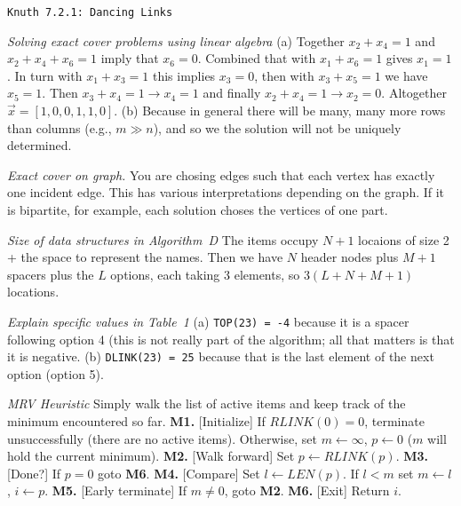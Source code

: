 \topglue 0.5in
\centerline{\tt Knuth 7.2.1: Dancing Links}
\vskip 0.3in

 {\it Solving exact cover problems using
linear algebra}\hfil\break
(a) Together $x_2 + x_4 = 1$ and $x_2 + x_4 + x_6 = 1$
imply that $x_6 = 0$.  Combined that with $x_1 + x_6 = 1$
gives $x_1 = 1$.  In turn with $x_1 + x_3 = 1$ this implies
$x_3 = 0$, then with $x_3 + x_5 = 1$ we have $x_5 = 1$.
Then $x_3 + x_4 = 1 \rightarrow x_4 = 1$ and finally
$x_2 + x_4 = 1 \rightarrow x_2 = 0$.  Altogether
$\vec{x} = [1, 0, 0, 1, 1, 0]$.\hfil\break
(b) Because in general there will be many, many more
rows than columns (e.g., $m \gg n$), and so we the solution
will not be uniquely determined.

 {\it Exact cover on graph.}\hfil\break
You are chosing edges such that each vertex has exactly one incident edge.
This has various interpretations depending on the graph.  If it is bipartite, for
example, each solution choses the vertices of one part.

 {\it Size of data structures in Algorithm~D}\hfil\break
The items occupy $N+1$ locaions of size 2 + the space to represent the names.
Then we have $N$ header nodes plus $M+1$ spacers plus the $L$ options,
each taking 3 elements, so $3\left(L + N + M + 1\right)$ locations.

 {\it Explain specific values in Table~1}\hfil\break
(a) {\tt TOP(23) = -4} because it is a spacer following option 4 (this is not
really part of the algorithm; all that matters is that it is negative.\hfil\break
(b) {\tt DLINK(23) = 25} because that is the last element of the next option
(option 5).

 {\it MRV Heuristic}\hfil\break
Simply walk the list of active items and keep track of the minimum encountered
so far.\hfil\break
{\bf M1.} [Initialize] If $RLINK\left(0\right) = 0$, terminate unsuccessfully (there are no
 active items).  Otherwise, set $m \leftarrow \infty$, $p \leftarrow 0$ ($m$ will hold
 the current minimum).\hfil\break
{\bf M2.} [Walk forward] Set $p \leftarrow RLINK\left(p\right)$.\hfil\break
{\bf M3.} [Done?] If $p = 0$ goto {\bf M6}.\hfil\break
{\bf M4.} [Compare] Set $l \leftarrow LEN\left(p\right)$.  If $l < m$ set $m \leftarrow l$,
 $i \leftarrow p$.\hfil\break
{\bf M5.} [Early terminate] If $m \ne 0$, goto {\bf M2}.\hfil\break
{\bf M6.} [Exit] Return $i$.\hfil\break

\bye